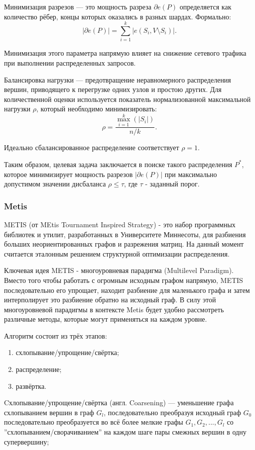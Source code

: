 Минимизация разрезов --- это мощность разреза $\partial e(P)$ определяется как количество рёбер, концы которых оказались в разных шардах. Формально:
$$
|\partial e(P)| = \sum_{i=1}^{k} |e(S_i, V \setminus S_i)|.
$$

Минимизация этого параметра напрямую влияет на снижение сетевого трафика при выполнении распределенных запросов.

Балансировка нагрузки --- предотвращение неравномерного распределения вершин, приводящего к перегрузке одних узлов и простою других. Для количественной оценки используется показатель нормализованной максимальной нагрузки $\rho$, который необходимо минимизировать:
$$
\rho = \frac{\max_{i=1}^{k} (|S_i|)}{n/k}.
$$

Идеально сбалансированное распределение соответствует $\rho = 1$.

Таким образом, целевая задача заключается в поиске такого распределения $P^*$, которое минимизирует мощность разрезов $|\partial e(P)|$ при максимально допустимом значении дисбаланса $\rho \leq \tau$, где $\tau$ - заданный порог.

\subsubsection{Metis}

METIS (от MEtis Tournament Inspired Strategy) \cite{MetisOG} - это набор программных библиотек и утилит, разработанных в Университете Миннесоты, для разбиения больших неориентированных графов и разрежения матриц. На данный момент считается эталонным решением структурной оптимизации распределения.

Ключевая идея METIS - многоуровневая парадигма (Multilevel Paradigm). Вместо того чтобы работать с огромным исходным графом напрямую, METIS последовательно его упрощает, находит разбиение для маленького графа и затем интерполирует это разбиение обратно на исходный граф. В силу этой многоуровневой парадигмы в контексте Metis будет удобно рассмотреть различные методы, которые могут применяться на каждом уровне.


Алгоритм состоит из трёх этапов: 
\begin{enumerate}
    \item схлопывание/упрощение/свёртка;
    \item распределение;
    \item развёртка.    
\end{enumerate}

Cхлопывание/упрощение/свёртка (англ. Coarsening) --- уменьшение графа схлопыванием вершин в граф $G_l$, последовательно преобразуя исходный граф $G_0$ последовательно преобразуется во всё более мелкие графы $G_1, G_2, ..., G_l$ со ''схлопыванием/сворачиванием'' на каждом шаге пары смежных вершин в одну супервершину;


